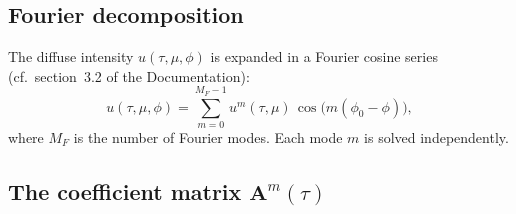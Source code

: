 \documentclass[11pt,a4paper]{article}
\newcommand{\mat}[1]{\mathbf{#1}}
\theoremstyle{definition}
\begin{document}
\subsection{Fourier decomposition}

The diffuse intensity $u(\tau,\mu,\phi)$ is expanded in a Fourier
cosine series (cf.\ section~3.2 of the Documentation):
\begin{equation}\label{eq:fourier}
  u(\tau,\mu,\phi)
  = \sum_{m=0}^{M_F-1} u^m(\tau,\mu)\,\cos\bigl(m(\phi_0-\phi)\bigr),
\end{equation}
where $M_F$ is the number of Fourier modes.  Each mode $m$ is solved
independently.

\subsection{The coefficient matrix \texorpdfstring{$\mat{A}^m(\tau)$}{A\_m(tau)}}
\end{document}
